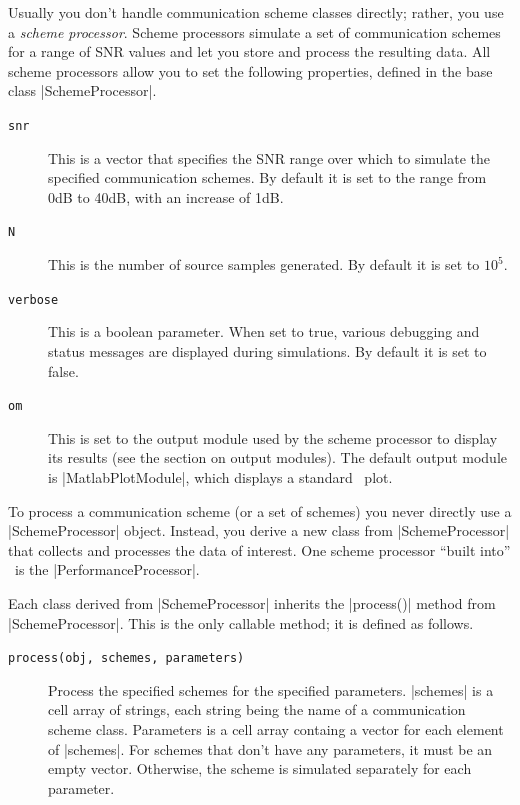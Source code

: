 Usually you don't handle communication scheme classes directly; rather, you use
a \emph{scheme processor}. Scheme processors simulate a set of communication
schemes for a range of SNR values and let you store and process the resulting
data.  All scheme processors allow you to set the following properties, defined
in the base class |SchemeProcessor|.
\begin{description}
  \item[\texttt{snr}] This is a vector that specifies the SNR range over which
    to simulate the specified communication schemes. By default it is set to the
    range from 0dB to 40dB, with an increase of 1dB. 

  \item[\texttt{N}] This is the number of source samples generated. By default
    it is set to $10^5$. 
    
  \item[\texttt{verbose}] This is a boolean parameter. When set to true, various
    debugging and status messages are displayed during simulations. By default
    it is set to false. 

  \item[\texttt{om}] This is set to the output module used by the scheme
    processor to display its results (see the section on output modules). The
    default output module is |MatlabPlotModule|, which displays a standard
    \matlab\ plot.
\end{description}

To process a communication scheme (or a set of schemes) you never directly use
a |SchemeProcessor| object. Instead, you derive a new class from
|SchemeProcessor| that collects and processes the data of interest. One scheme
processor ``built into'' \jscsim\ is the |PerformanceProcessor|.

Each class derived from |SchemeProcessor| inherits the |process()| method from
|SchemeProcessor|. This is the only callable method; it is defined as follows. 
\begin{description}
  \item[\texttt{process(obj, schemes, parameters)}] Process the specified
    schemes for the specified parameters. |schemes| is a cell array of strings,
    each string being the name of a communication scheme class. Parameters is a
    cell array containg a vector for each element of |schemes|. For schemes that
    don't have any parameters, it must be an empty vector. Otherwise, the scheme
    is simulated separately for each parameter. 
\end{description}


